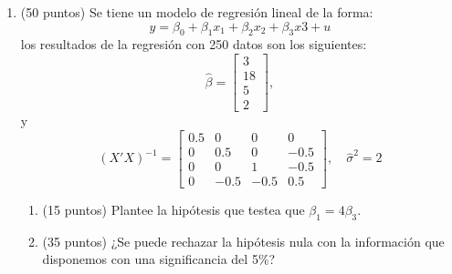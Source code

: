 \documentclass[10pt,a4paper]{article}
\begin{document}
\begin{enumerate}
\begin{enumerate}[label=\alph*)]
          \item El intervalo de confianza al 95\% es:
                \[
                  \left[
                    \hat\beta_1 - t_{2.5\%} \times s.e.(\hat\beta_1),
                    \hat\beta_1 + t_{2.5\%} \times s.e.(\hat\beta_1)
                  \right]
                  =
                  \left[
                    3.2 - 1.96 \times \sqrt{1.7},
                    3.2 + 1.96 \times \sqrt{1.7}
                  \right]
                  =
                  \left[
                    0.644; 5.756
                  \right].
                \]
                \textbf{Interpretación:} Con 95\% de confianza, se espera que
                el verdadero efecto de \( X_1 \) sobre la variable dependiente
                esté entre 0.644 y 5.756 unidades. Es decir, un aumento en
                \( X_1 \) está asociado, en promedio, a un aumento positivo y
                significativo en la variable dependiente.
        \end{enumerate}


\item (50 puntos) Se tiene un modelo de regresión lineal de la forma:
$$y=\beta_0 + \beta_1 x_1+\beta_2x_2+\beta_3 x3 + u$$
los resultados de la regresión con 250 datos son los siguientes:
        \[
          \hat{\beta} = \begin{bmatrix} 3 \\ 18 \\ 5 \\2 \end{bmatrix},
        \]
y 
        \[
          (X'X)^{-1} =
          \begin{bmatrix}
0.5 & 0  & 0  &  0\\
0 & 0.5  & 0  & -0.5\\
0 & 0  & 1  & -0.5\\
0 & -0.5 & -0.5 &  0.5
\end{bmatrix},
          \quad \hat{\sigma}^2 = 2
        \]
\begin{enumerate}
    \item (15 puntos) Plantee la hipótesis que testea que $\beta_1=4\beta_3$.

    \item (35 puntos) ¿Se puede rechazar la hipótesis nula con la información que disponemos con una significancia del 5\%? 
\end{enumerate}


\end{enumerate}
\end{document}
